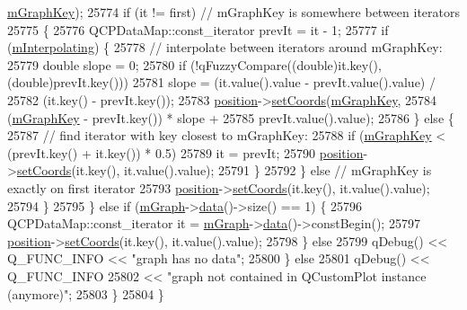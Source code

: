 \begin{DoxyCode}
      \hyperlink{class_q_c_p_item_tracer_a8fa20f2e9ee07d21fd7c8d30ba4702ca}{mGraphKey});
25774           \textcolor{keywordflow}{if} (it != first) \textcolor{comment}{// mGraphKey is somewhere between iterators}
25775           \{
25776             QCPDataMap::const\_iterator prevIt = it - 1;
25777             \textcolor{keywordflow}{if} (\hyperlink{class_q_c_p_item_tracer_afab37c22ad39f235921e86f93cd84595}{mInterpolating}) \{
25778               \textcolor{comment}{// interpolate between iterators around mGraphKey:}
25779               \textcolor{keywordtype}{double} slope = 0;
25780               \textcolor{keywordflow}{if} (!qFuzzyCompare((\textcolor{keywordtype}{double})it.key(), (double)prevIt.key()))
25781                 slope = (it.value().value - prevIt.value().value) /
25782                         (it.key() - prevIt.key());
25783               \hyperlink{class_q_c_p_item_tracer_a69917e2fdb2b3a929c196958feee7cbe}{position}->\hyperlink{class_q_c_p_item_position_aa988ba4e87ab684c9021017dcaba945f}{setCoords}(\hyperlink{class_q_c_p_item_tracer_a8fa20f2e9ee07d21fd7c8d30ba4702ca}{mGraphKey},
25784                                   (\hyperlink{class_q_c_p_item_tracer_a8fa20f2e9ee07d21fd7c8d30ba4702ca}{mGraphKey} - prevIt.key()) * slope +
25785                                       prevIt.value().value);
25786             \} \textcolor{keywordflow}{else} \{
25787               \textcolor{comment}{// find iterator with key closest to mGraphKey:}
25788               \textcolor{keywordflow}{if} (\hyperlink{class_q_c_p_item_tracer_a8fa20f2e9ee07d21fd7c8d30ba4702ca}{mGraphKey} < (prevIt.key() + it.key()) * 0.5)
25789                 it = prevIt;
25790               \hyperlink{class_q_c_p_item_tracer_a69917e2fdb2b3a929c196958feee7cbe}{position}->\hyperlink{class_q_c_p_item_position_aa988ba4e87ab684c9021017dcaba945f}{setCoords}(it.key(), it.value().value);
25791             \}
25792           \} \textcolor{keywordflow}{else} \textcolor{comment}{// mGraphKey is exactly on first iterator}
25793             \hyperlink{class_q_c_p_item_tracer_a69917e2fdb2b3a929c196958feee7cbe}{position}->\hyperlink{class_q_c_p_item_position_aa988ba4e87ab684c9021017dcaba945f}{setCoords}(it.key(), it.value().value);
25794         \}
25795       \} \textcolor{keywordflow}{else} \textcolor{keywordflow}{if} (\hyperlink{class_q_c_p_item_tracer_a2d70cf616b579563aa15f796dfc143ac}{mGraph}->\hyperlink{class_q_c_p_graph_a2f58436df4f86a2792b776a21642b3d9}{data}()->size() == 1) \{
25796         QCPDataMap::const\_iterator it = \hyperlink{class_q_c_p_item_tracer_a2d70cf616b579563aa15f796dfc143ac}{mGraph}->\hyperlink{class_q_c_p_graph_a2f58436df4f86a2792b776a21642b3d9}{data}()->constBegin();
25797         \hyperlink{class_q_c_p_item_tracer_a69917e2fdb2b3a929c196958feee7cbe}{position}->\hyperlink{class_q_c_p_item_position_aa988ba4e87ab684c9021017dcaba945f}{setCoords}(it.key(), it.value().value);
25798       \} \textcolor{keywordflow}{else}
25799         qDebug() << Q\_FUNC\_INFO << \textcolor{stringliteral}{"graph has no data"};
25800     \} \textcolor{keywordflow}{else}
25801       qDebug() << Q\_FUNC\_INFO
25802                << \textcolor{stringliteral}{"graph not contained in QCustomPlot instance (anymore)"};
25803   \}
25804 \}
\end{DoxyCode}


